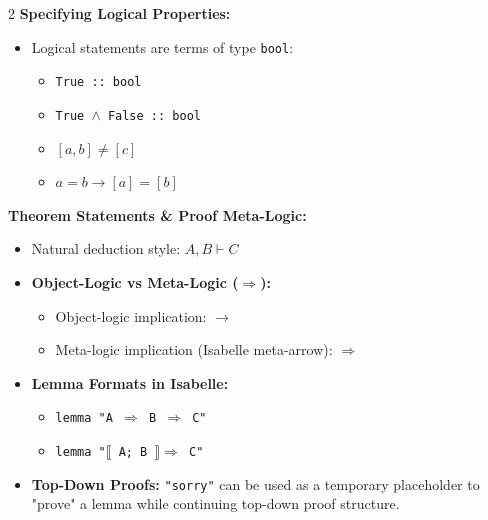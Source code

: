 \documentclass[10pt,a4paper]{article}
\begin{document}
\begin{tcolorbox}[title=3. Logical Properties \& Theorem Statements]
\begin{multicols}{2}
\textbf{Specifying Logical Properties:}
\begin{itemize}[leftmargin=1.2em, itemsep=3pt]
    \item Logical statements are terms of type \texttt{bool}:
    \begin{itemize}[leftmargin=1em, label=$\bullet$]
        \item \texttt{True :: bool}
        \item \texttt{True $\land$ False :: bool}
        \item $[a, b] \neq [c]$
        \item $a = b \longrightarrow [a] = [b]$
    \end{itemize}
\end{itemize}

\columnbreak

\textbf{Theorem Statements \& Proof Meta-Logic:}
\begin{itemize}[leftmargin=1.2em, itemsep=3pt]
    \item Natural deduction style: $A, B \vdash C$
    \item \textbf{Object-Logic vs Meta-Logic ($\Longrightarrow$):}
    \begin{itemize}[leftmargin=1em, label=$\rightarrow$]
        \item Object-logic implication: $\longrightarrow$
        \item Meta-logic implication (Isabelle meta-arrow): $\Longrightarrow$
    \end{itemize}
    \item \textbf{Lemma Formats in Isabelle:}
    \begin{itemize}[leftmargin=1em, label=$\bullet$]
        \item \texttt{lemma "A $\Longrightarrow$ B $\Longrightarrow$ C"}
        \item \texttt{lemma "$\llbracket$ A; B $\rrbracket \Longrightarrow$ C"}
    \end{itemize}
    \item \textbf{Top-Down Proofs:} \texttt{"sorry"} can be used as a temporary placeholder to "prove" a lemma while continuing top-down proof structure.
\end{itemize}
\end{multicols}
\end{tcolorbox}
\end{document}
